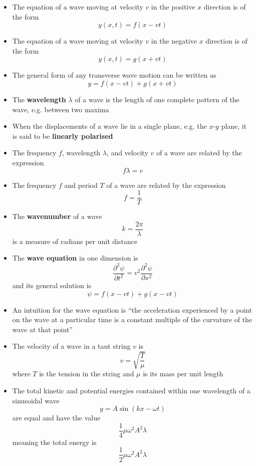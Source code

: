\documentclass{article}
\begin{document}
\begin{itemize}
  \item The equation of a wave moving at velocity $v$ in the positive $x$ direction is of the form \[y(x, t) = f(x - v t)\]

  \item The equation of a wave moving at velocity $v$ in the negative $x$ direction is of the form \[y(x, t) = g(x + v t)\]

  \item The general form of any transverse wave motion can be written as \[y = f(x - v t) + g(x + v t)\]

  \item The \textbf{wavelength} $\lambda$ of a wave is the length of one complete pattern of the wave, e.g. between two maxima

  \item When the displacements of a wave lie in a single plane, e.g. the $x$-$y$ plane, it is said to be \textbf{linearly polarised}

  \item The frequency $f$, wavelength $\lambda$, and velocity $v$ of a wave are related by the expression \[f \lambda = v\]

  \item The frequency $f$ and period $T$ of a wave are related by the expression \[f = \frac{1}{T}\]

  \item The \textbf{wavenumber} of a wave \[k = \frac{2 \pi}{\lambda}\] is a measure of radians per unit distance

  \item The \textbf{wave equation} in one dimension is \[\frac{\partial^2 \psi}{\partial t^2} = v^2 \frac{\partial^2 \psi}{\partial x^2}\] and its general solution is \[\psi = f(x - v t) + g(x - v t)\]

  \item An intuition for the wave equation is ``the acceleration experienced by a point on the wave at a particular time is a constant multiple of the curvature of the wave at that point''

  \item The velocity of a wave in a taut string $v$ is \[v = \sqrt{\frac{T}{\mu}}\] where $T$ is the tension in the string and $\mu$ is its mass per unit length

  \item The total kinetic and potential energies contained within one wavelength of a sinusoidal wave \[y = A \sin (k x - \omega t)\] are equal and have the value \[\frac{1}{4} \mu \omega^2 A^2 \lambda\] meaning the total energy is \[\frac{1}{2} \mu \omega^2 A^2 \lambda\]


\end{itemize}
\end{document}
